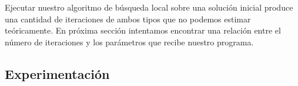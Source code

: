 Ejecutar nuestro algoritmo de b\'usqueda local sobre una soluci\'on inicial produce una cantidad de iteraciones de ambos tipos que no podemos estimar te\'oricamente. En pr\'oxima secci\'on intentamos encontrar una relaci\'on entre el n\'umero de iteraciones y los par\'ametros que recibe nuestro programa.

\subsection{Experimentación}



